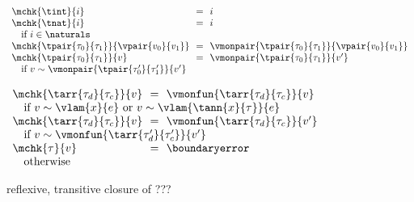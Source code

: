 \begin{flushleft}
\medskip
{}
\begin{minipage}[t]{\columnwidth}
$\begin{array}{l@{~~}c@{~~}l}
  \mchk{\tint}{i} & = & i
\\
  \mchk{\tnat}{i} & = & i
\\ \multicolumn{3}{l}{\mbox{\quad if $i \in \naturals$}}
\\
  \mchk{\tpair{\tau_0}{\tau_1}}{\vpair{v_0}{v_1}} & = & \vmonpair{\tpair{\tau_0}{\tau_1}}{\vpair{v_0}{v_1}}
\\
  \mchk{\tpair{\tau_0}{\tau_1}}{v} & = & \vmonpair{\tpair{\tau_0}{\tau_1}}{v'}
\\ \multicolumn{3}{l}{\mbox{\quad if $v \sim \vmonpair{\tpair{\tau_0'}{\tau_1'}}{v'}$}}
\end{array}$
\end{minipage}%
\begin{minipage}[t]{\columnwidth}
$\begin{array}{l@{~~}c@{~~}l}
  \mchk{\tarr{\tau_d}{\tau_c}}{v} & = & \vmonfun{\tarr{\tau_d}{\tau_c}}{v}
\\ \multicolumn{3}{l}{\mbox{\quad if $v \sim \vlam{x}{e}$ or $v \sim \vlam{\tann{x}{\tau}}{e}$}}
\\
  \mchk{\tarr{\tau_d}{\tau_c}}{v} & = & \vmonfun{\tarr{\tau_d}{\tau_c}}{v'}
\\ \multicolumn{3}{l}{\mbox{\quad if $v \sim \vmonfun{\tarr{\tau_d'}{\tau_c'}}{v'}$}}
\\
  \mchk{\tau}{v} & = & \boundaryerror
\\ \multicolumn{3}{l}{\mbox{\quad otherwise}}
\end{array}$
\end{minipage}

\medskip
{} reflexive, transitive closure of ??? %
\smallskip
\end{flushleft}
